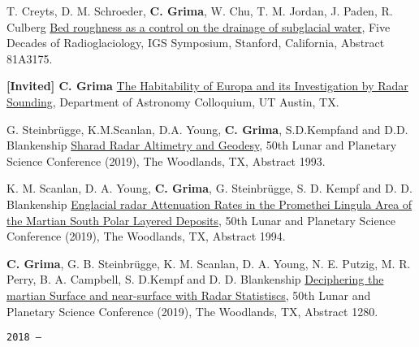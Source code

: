 \begin{etaremune}
  T. Creyts, D. M. Schroeder, \textbf{C. Grima}, W. Chu, T. M. Jordan,
  J. Paden, R. Culberg
  \href{https://www.igsoc.org/symposia/2019/stanford/proceedings/programmepure.html\#Prog3175}{Bed
  roughness as a control on the drainage of subglacial water}, Five
  Decades of Radioglaciology, IGS Symposium, Stanford, California,
  Abstract 81A3175.
\item
  \textbf{{[}Invited{]} C. Grima}
  \href{https://astronomy.utexas.edu/calendar/icalrepeat.detail/2019/05/07/1040/-/cyril-grima-ut-institute-for-geophysics?filter_reset=1\#abstract}{The
  Habitability of Europa and its Investigation by Radar Sounding},
  Department of Astronomy Colloquium, UT Austin, TX.
\item
  G. Steinbrügge, K.M.Scanlan, D.A. Young, \textbf{C. Grima},
  S.D.Kempfand and D.D. Blankenship
  \href{https://www.hou.usra.edu/meetings/lpsc2019/pdf/1993.pdf}{Sharad
  Radar Altimetry and Geodesy}, 50th Lunar and Planetary Science
  Conference (2019), The Woodlands, TX, Abstract 1993.
\item
  K. M. Scanlan, D. A. Young, \textbf{C. Grima}, G. Steinbrügge, S. D.
  Kempf and D. D. Blankenship
  \href{https://www.hou.usra.edu/meetings/lpsc2019/pdf/1994.pdf}{Englacial
  radar Attenuation Rates in the Promethei Lingula Area of the Martian
  South Polar Layered Deposits}, 50th Lunar and Planetary Science
  Conference (2019), The Woodlands, TX, Abstract 1994.
\item
  \textbf{C. Grima}, G. B. Steinbrügge, K. M. Scanlan, D. A. Young, N.
  E. Putzig, M. R. Perry, B. A. Campbell, S. D.Kempf and D. D.
  Blankenship
  \href{https://www.hou.usra.edu/meetings/lpsc2019/pdf/1280.pdf}{Deciphering
  the martian Surface and near-surface with Radar Statistiscs}, 50th
  Lunar and Planetary Science Conference (2019), The Woodlands, TX,
  Abstract 1280.

\hspace{-2em}\texttt{2018 ---}


\end{etaremune}
